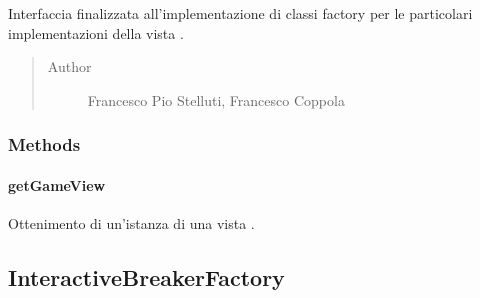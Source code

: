 \documentclass[letterpaper,10pt,italian,openany,oneside]{sphinxmanual}
\begin{document}
\begin{fulllineitems}
\label{\detokenize{source/it/unicam/cs/pa/mastermind/factories/GameViewFactory:it.unicam.cs.pa.mastermind.factories.GameViewFactory}}
Interfaccia finalizzata all’implementazione di classi factory per le particolari implementazioni della vista .
\begin{quote}\begin{description}
\item[{Author}] \leavevmode
Francesco Pio Stelluti, Francesco Coppola

\end{description}\end{quote}

\end{fulllineitems}



\subsubsection{Methods}
\label{\detokenize{source/it/unicam/cs/pa/mastermind/factories/GameViewFactory:methods}}

\paragraph{getGameView}
\label{\detokenize{source/it/unicam/cs/pa/mastermind/factories/GameViewFactory:getgameview}}

\begin{fulllineitems}
\label{\detokenize{source/it/unicam/cs/pa/mastermind/factories/GameViewFactory:it.unicam.cs.pa.mastermind.factories.GameViewFactory.getGameView()}}
Ottenimento di un’istanza di una vista .

\end{fulllineitems}



\subsection{InteractiveBreakerFactory}
\label{\detokenize{source/it/unicam/cs/pa/mastermind/factories/InteractiveBreakerFactory:interactivebreakerfactory}}\label{\detokenize{source/it/unicam/cs/pa/mastermind/factories/InteractiveBreakerFactory::doc}}
\end{document}
